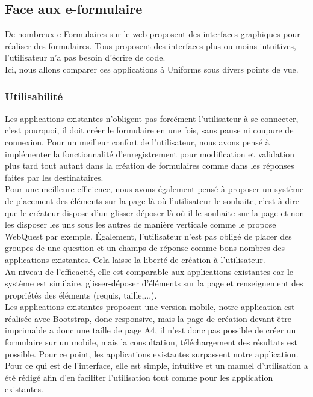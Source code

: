 \documentclass{sigplanconf}
\begin{document}
\subsection{Face aux e-formulaire}
De nombreux e-Formulaires sur le web proposent des interfaces graphiques pour réaliser des formulaires. Tous proposent des interfaces plus ou moins intuitives, l’utilisateur n’a pas besoin d’écrire de code. \\
Ici, nous allons comparer ces applications à Uniforms sous divers points de vue.
\subsubsection{Utilisabilité}
Les applications existantes n’obligent pas forcément l’utilisateur à se connecter, c’est pourquoi, il doit créer le formulaire en une fois, sans pause ni coupure de connexion. Pour un meilleur confort de l’utilisateur, nous avons pensé à implémenter la fonctionnalité d’enregistrement pour modification et validation plus tard tout autant dans la création de formulaires comme dans les réponses faites par les destinataires.\\
Pour une meilleure efficience, nous avons également pensé à proposer un système de placement des éléments sur la page là où l’utilisateur le souhaite, c’est-à-dire que le créateur dispose d’un glisser-déposer là où il le souhaite sur la page et non les disposer les uns sous les autres de manière verticale comme le propose WebQuest par exemple. Également, l’utilisateur n’est pas obligé de placer des groupes de une question et un champs de réponse comme bons nombres des applications existantes. Cela laisse la liberté de création à l’utilisateur.\\
Au niveau de l’efficacité, elle est comparable aux applications existantes car le système est similaire, glisser-déposer d’éléments sur la page et renseignement des propriétés des éléments (requis, taille,...).\\
Les applications existantes proposent une version mobile, notre application est réalisée avec Bootstrap, donc responsive, mais la page de création devant être imprimable a donc une taille de page A4, il n’est donc pas possible de créer un formulaire sur un mobile, mais la consultation, téléchargement des résultats est possible. Pour ce point, les applications existantes surpassent notre application.\\
Pour ce qui est de l’interface, elle est simple, intuitive et un manuel d’utilisation a été rédigé afin d’en faciliter l’utilisation tout comme pour les application existantes.
\end{document}
